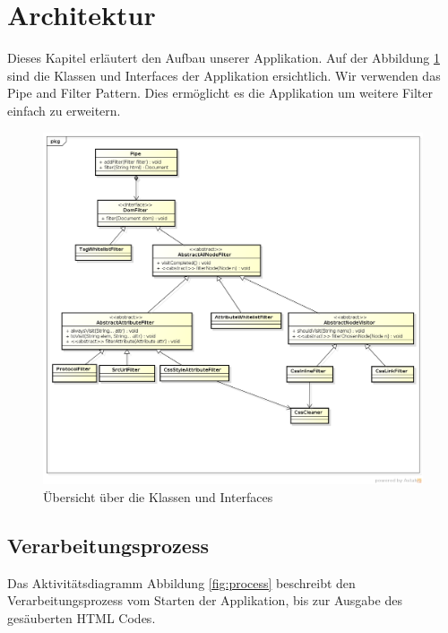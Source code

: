 \section{Architektur}

Dieses Kapitel erläutert den Aufbau unserer Applikation.
Auf der Abbildung \ref{fig:overview} sind die Klassen und Interfaces der Applikation ersichtlich.
Wir verwenden das Pipe and Filter Pattern. Dies ermöglicht es die Applikation um weitere Filter einfach zu erweitern. 

\begin{figure}[ht]
	\begin{center}
		\includegraphics[width=1.0\textwidth]{./content/Class_Overview.png}
	\end{center}
	\caption{Übersicht über die Klassen und Interfaces}
	\label{fig:overview}
\end{figure}

\subsection{Verarbeitungsprozess}

Das Aktivitätsdiagramm Abbildung \ref{fig:process} beschreibt den Verarbeitungsprozess vom Starten der Applikation, bis zur Ausgabe des gesäuberten HTML Codes.

